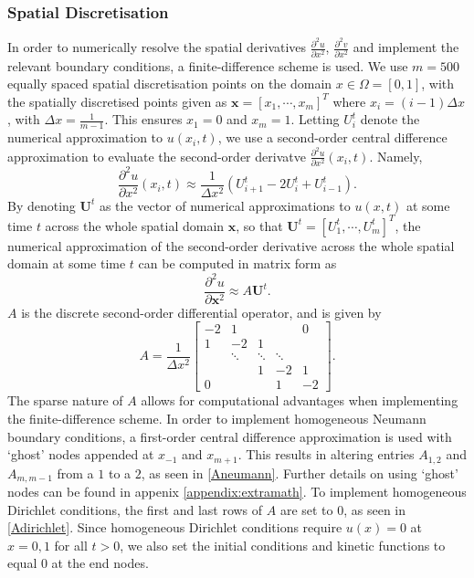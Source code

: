 \subsubsection{Spatial Discretisation}
In order to numerically resolve the spatial derivatives $\frac{\partial^2 u}{\partial x^2}$, $\frac{\partial^2 v}{\partial x^2}$ and implement the relevant boundary conditions, a finite-difference scheme is used. We use $m=500$ equally spaced spatial discretisation points on the domain $x\in\Omega=[0,1]$, with the spatially discretised points given as $\textbf{x}=[x_1,\cdots,x_m]^T$ where $x_i=(i-1)\Delta x$, with $\Delta x=\frac{1}{m-1}$. This ensures $x_1=0$ and $x_m=1$. Letting $U_i^t$ denote the numerical approximation to $u(x_i,t)$, we use a second-order central difference approximation \cite{finitediff} to evaluate the second-order derivatve $\frac{\partial^2 u}{\partial x^2}(x_i,t)$. Namely,
\begin{equation}
\frac{\partial^2 u}{\partial x^2}(x_i,t)\approx\frac{1}{\Delta x^2}\left(U_{i+1}^t-2U_i^t+U_{i-1}^t\right).
\end{equation}
By denoting $\textbf{U}^t$ as the vector of numerical approximations to $u(x,t)$ at some time $t$ across the whole spatial domain $\textbf{x}$, so that $\textbf{U}^t=\left[U_1^t,\cdots,U_m^t\right]^T$, the numerical approximation of the second-order derivative across the whole spatial domain at some time $t$ can be computed in matrix form as
\begin{equation}
    \frac{\partial^2 u}{\partial \textbf{x}^2}\approx A\textbf{U}^t.
\end{equation}
$A$ is the discrete second-order differential operator, and is given by
\begin{equation}\label{A}
A=\frac{1}{\Delta x^2}\begin{bmatrix}
   -2&  1&  &  & 0\\
   1&  -2&  1&  & \\
   &  \ddots&  \ddots&  \ddots& \\
   &  &  1&  -2& 1\\
   0&  &  &  1& -2
  \end{bmatrix}.
\end{equation}
The sparse nature of $A$ allows for computational advantages when implementing the finite-difference scheme. In order to implement homogeneous Neumann boundary conditions, a first-order central difference approximation is used with `ghost' nodes appended at $x_{-1}$ and $x_{m+1}$. This results in altering entries $A_{1,2}$ and $A_{m,m-1}$ from a $1$ to a $2$, as seen in \eqref{Aneumann}. Further details on using `ghost' nodes can be found in appenix \ref{appendix:extramath}. To implement homogeneous Dirichlet conditions, the first and last rows of $A$ are set to $0$, as seen in \eqref{Adirichlet}. Since homogeneous Dirichlet conditions require $u(x)=0$ at $x=0,1$ for all $t>0$, we also set the initial conditions and kinetic functions to equal $0$ at the end nodes.
